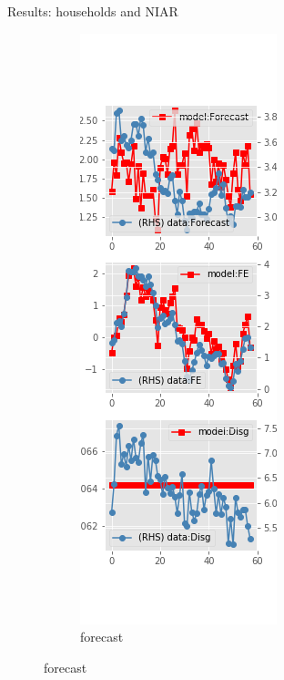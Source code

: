 \documentclass{beamer}
\begin{document}
\begin{frame}{Results: households and NIAR}
	\begin{figure}[ht]
		\label{NI_diag_SCE}
		\begin{subfigure}[b]{0.19\textwidth}
			\centering
			\caption{forecast}
			\includegraphics[width=\textwidth, height = 0.8\textheight]{figuresDraft/sce_ni_est_diag0.png}

\end{subfigure}
\end{figure}
\end{frame}
\end{document}
